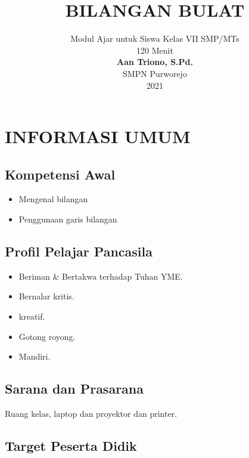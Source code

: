 \documentclass[a5paper,10pt,openany]{book}
\title{\vspace{-15mm}\bfseries BILANGAN BULAT}
\author{Modul Ajar untuk Siswa Kelas VII SMP/MTs\\ 120 Menit\\[9mm]\small\textbf{Aan Triono, S.Pd.}\\[-2mm]\small SMPN Purworejo\\[-2mm]\small2021 }
\date{}
\begin{document}

\fontsize{9pt}{9pt}\linespread{1.5}\selectfont

\maketitle
\tableofcontents

\cleardoublepage

\chapter{INFORMASI UMUM}

\section{Kompetensi Awal}

{\color{NavyBlue}
\begin{itemize}[\faCheckCircle,leftmargin=*,itemsep=-4pt,topsep=2pt]	
\item 	Mengenal bilangan 
\item 	Penggunaan garis bilangan
\end{itemize}
}

\section{Profil Pelajar Pancasila}

{\color{NavyBlue}
\begin{itemize}[\faCheckCircle,leftmargin=*,itemsep=-4pt,topsep=2pt]
\item Beriman \& Bertakwa terhadap Tuhan YME.
\item Bernalar kritis.
\item kreatif.
\item Gotong royong.
\item Mandiri.
\end{itemize}
}

\section{Sarana dan Prasarana}

{\color{NavyBlue}Ruang kelas, laptop dan proyektor dan printer.}

\newpage
\section{Target Peserta Didik}
\end{document}
